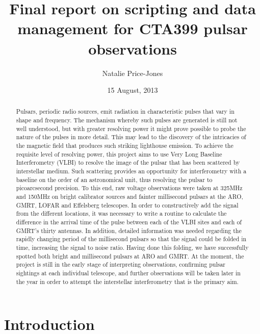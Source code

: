 \documentclass[a4paper,12pt]{article}
\begin{document}
\citeindextrue
\title{Final report on scripting and data management for CTA399 pulsar observations}
\author{Natalie Price-Jones}
\date{15 August, 2013}

\begin{abstract}
Pulsars, periodic radio sources, emit radiation in characteristic pulses that vary in shape and frequency. The mechanism whereby such pulses are generated is still not well understood, but with greater resolving power it might prove possible to probe the nature of the pulses in more detail. This may lead to the discovery of the intricacies of the magnetic field that produces such striking lighthouse emission. To achieve the requisite level of resolving power, this project aims to use Very Long Baseline Interferometry (VLBI) to resolve the image of the pulsar that has been scattered by interstellar medium. Such scattering provides an opportunity for interferometry with a baseline on the order of an astronomical unit, thus resolving the pulsar to picoarcsecond precision. To this end, raw voltage observations were taken at 325MHz and 150MHz on bright calibrator sources and fainter millisecond pulsars at the ARO, GMRT, LOFAR and Effelsberg telescopes.  In order to constructively add the signal from the different locations, it was necessary to write a routine to calculate the difference in the arrival time of the pulse between each of the VLBI sites and each of GMRT’s thirty antennas. In addition, detailed information was needed regarding the rapidly changing period of the millisecond pulsars so that the signal could be folded in time, increasing the signal to noise ratio. Having done this folding, we have successfully spotted both bright and millisecond pulsars at ARO and GMRT. At the moment, the project is still in the early stage of interpreting observations, confirming pulsar sightings at each individual telescope, and further observations will be taken later in the year in order to attempt the interstellar interferometry that is the primary aim. 
\end{abstract}

\section{Introduction}
\subsection{}



\begin{thebibliography}{100}

\end{thebibliography}
\end{document}
